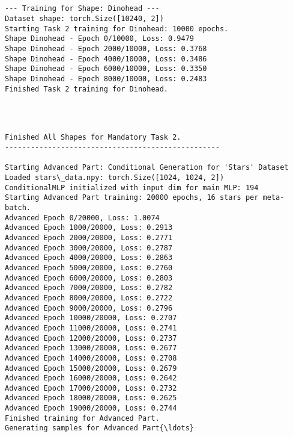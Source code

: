 \documentclass[11pt]{article}
\begin{document}
    \begin{center}
    \end{center}
    { \hspace*{\fill} \\}
    
    \begin{Verbatim}[commandchars=\\\{\}]

--- Training for Shape: Dinohead ---
Dataset shape: torch.Size([10240, 2])
Starting Task 2 training for Dinohead: 10000 epochs.
Shape Dinohead - Epoch 0/10000, Loss: 0.9479
Shape Dinohead - Epoch 2000/10000, Loss: 0.3768
Shape Dinohead - Epoch 4000/10000, Loss: 0.3486
Shape Dinohead - Epoch 6000/10000, Loss: 0.3350
Shape Dinohead - Epoch 8000/10000, Loss: 0.2483
Finished Task 2 training for Dinohead.
    \end{Verbatim}

    \begin{center}
    \end{center}
    { \hspace*{\fill} \\}
    
    \begin{Verbatim}[commandchars=\\\{\}]

Finished All Shapes for Mandatory Task 2.
--------------------------------------------------

Starting Advanced Part: Conditional Generation for 'Stars' Dataset
Loaded stars\_data.npy: torch.Size([1024, 1024, 2])
ConditionalMLP initialized with input dim for main MLP: 194
Starting Advanced Part training: 20000 epochs, 16 stars per meta-batch.
Advanced Epoch 0/20000, Loss: 1.0074
Advanced Epoch 1000/20000, Loss: 0.2913
Advanced Epoch 2000/20000, Loss: 0.2771
Advanced Epoch 3000/20000, Loss: 0.2787
Advanced Epoch 4000/20000, Loss: 0.2863
Advanced Epoch 5000/20000, Loss: 0.2760
Advanced Epoch 6000/20000, Loss: 0.2803
Advanced Epoch 7000/20000, Loss: 0.2782
Advanced Epoch 8000/20000, Loss: 0.2722
Advanced Epoch 9000/20000, Loss: 0.2796
Advanced Epoch 10000/20000, Loss: 0.2707
Advanced Epoch 11000/20000, Loss: 0.2741
Advanced Epoch 12000/20000, Loss: 0.2737
Advanced Epoch 13000/20000, Loss: 0.2677
Advanced Epoch 14000/20000, Loss: 0.2708
Advanced Epoch 15000/20000, Loss: 0.2679
Advanced Epoch 16000/20000, Loss: 0.2642
Advanced Epoch 17000/20000, Loss: 0.2732
Advanced Epoch 18000/20000, Loss: 0.2625
Advanced Epoch 19000/20000, Loss: 0.2744
Finished training for Advanced Part.
Generating samples for Advanced Part{\ldots}
    \end{Verbatim}
\end{document}
